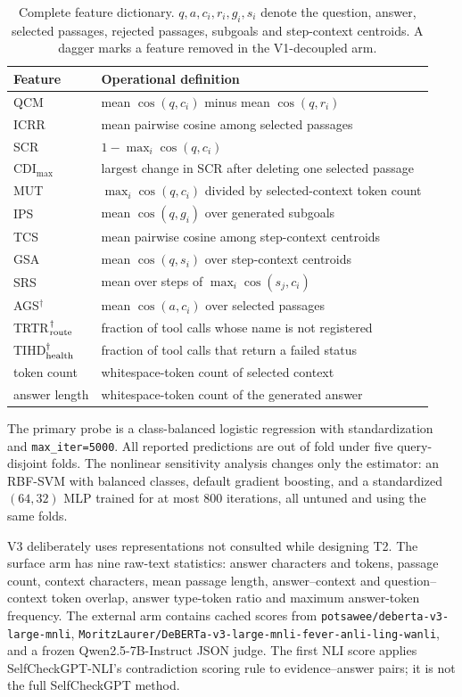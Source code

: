 \documentclass{article}
\begin{document}
\begin{table}[h]
\centering\scriptsize
\caption{Complete feature dictionary. $q,a,c_i,r_i,g_i,s_i$ denote the question, answer,
selected passages, rejected passages, subgoals and step-context centroids. A dagger marks a
feature removed in the V1-decoupled arm.}
\label{tab:features}
\begin{tabular}{@{}lp{10.8cm}@{}}
\toprule
Feature & Operational definition \\
\midrule
QCM & mean $\cos(q,c_i)$ minus mean $\cos(q,r_i)$ \\
ICRR & mean pairwise cosine among selected passages \\
SCR & $1-\max_i\cos(q,c_i)$ \\
CDI$_{\max}$ & largest change in SCR after deleting one selected passage \\
MUT & $\max_i\cos(q,c_i)$ divided by selected-context token count \\
IPS & mean $\cos(q,g_i)$ over generated subgoals \\
TCS & mean pairwise cosine among step-context centroids \\
GSA & mean $\cos(q,s_i)$ over step-context centroids \\
SRS & mean over steps of $\max_i\cos(s_j,c_i)$ \\
AGS$^\dagger$ & mean $\cos(a,c_i)$ over selected passages \\
TRTR$_{\rm route}^{\dagger}$ & fraction of tool calls whose name is not registered \\
TIHD$_{\rm health}^{\dagger}$ & fraction of tool calls that return a failed status \\
token count & whitespace-token count of selected context \\
answer length & whitespace-token count of the generated answer \\
\bottomrule
\end{tabular}
\end{table}

The primary probe is a class-balanced logistic regression with standardization and
\texttt{max\_iter=5000}. All reported predictions are out of fold under five query-disjoint
folds. The nonlinear sensitivity analysis changes only the estimator: an RBF-SVM with balanced
classes, default gradient boosting, and a standardized $(64,32)$ MLP trained for at most 800
iterations, all untuned and using the same folds.

V3 deliberately uses representations not consulted while designing T2. The surface arm has
nine raw-text statistics: answer characters and tokens, passage count, context characters,
mean passage length, answer--context and question--context token overlap, answer type-token
ratio and maximum answer-token frequency. The external arm contains cached scores from
\texttt{potsawee/deberta-v3-large-mnli},
\texttt{MoritzLaurer/DeBERTa-v3-large-mnli-fever-anli-ling-wanli}, and a frozen
Qwen2.5-7B-Instruct JSON judge. The first NLI score applies SelfCheckGPT-NLI's contradiction
scoring rule to evidence--answer pairs; it is not the full SelfCheckGPT method.
\end{document}
